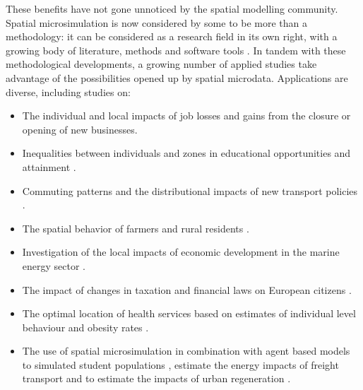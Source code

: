 \documentclass[a4paper,10pt]{article}
\begin{document}

These benefits have not gone unnoticed by the spatial modelling community.
Spatial microsimulation is now considered by some to be more than a methodology:
it can be considered as a research field in its
own right, with a growing body of literature, methods and software tools \citep{Tanton2013}.
In tandem with these methodological developments, a growing number of applied studies
take advantage of the possibilities opened up by spatial microdata.
Applications are diverse, including studies on:
\begin{itemize}
 \item The individual and local impacts
of job losses and gains from the closure \citep{Ballas2006}
or opening \citep{VanLeeuwen2010} of new businesses.
\item Inequalities between individuals and zones in educational opportunities
and attainment \citep{Kavroudakis2012}.
\item Commuting patterns and the distributional impacts
of new transport policies \citep{Lovelace2014-jtg}.
\item The spatial behavior of farmers and rural residents
\citep{Hynes2009,van2013determinants}.
\item Investigation of the local impacts of economic development
in the marine energy sector \citep{Morrissey2013a}.
\item The impact of changes
in taxation and financial laws on European citizens \citep{sutherland2013euromod}.
\item The optimal location of health services based
on estimates of individual level behaviour and obesity rates \citep{Tomintz2008,Clarke2010-valid}.
\item The use of spatial microsimulation in combination with
agent based models to simulated student populations \citep{Wu2010},
estimate the energy impacts of freight transport \citep{Zuo2013a}
and to estimate the impacts of urban regeneration \citep{jordan2011agent}.
\end{itemize}
\end{document}
